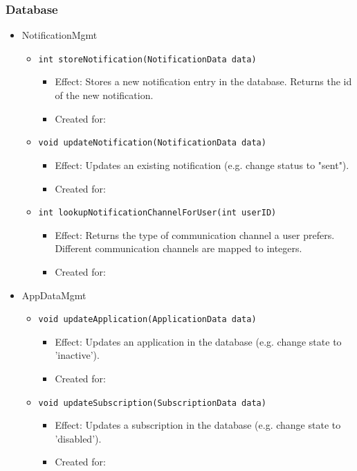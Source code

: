     \subsubsection{Database}
        \begin{itemize}
            \item NotificationMgmt
            \begin{itemize}
                \item \texttt{int storeNotification(NotificationData data)}
                \begin{itemize}
                    \item Effect: Stores a new notification entry in the database. Returns the id of the new notification.
                    \item Created for:
                \end{itemize}
                \item \texttt{void updateNotification(NotificationData data)}
                \begin{itemize}
                    \item Effect: Updates an existing notification (e.g. change status to "sent").
                    \item Created for:
                \end{itemize}
                \item \texttt{int lookupNotificationChannelForUser(int userID)}
                \begin{itemize}
                    \item Effect: Returns the type of communication channel a user prefers.
                                  Different communication channels are mapped to integers.
                    \item Created for:
                \end{itemize}
            \end{itemize}

            \item AppDataMgmt
            \begin{itemize}
                \item \texttt{void updateApplication(ApplicationData data)}
                \begin{itemize}
                    \item Effect: Updates an application in the database (e.g. change state to 'inactive').
                    \item Created for:
                \end{itemize}
                \item \texttt{void updateSubscription(SubscriptionData data)}
                \begin{itemize}
                    \item Effect: Updates a subscription in the database (e.g. change state to 'disabled').
                    \item Created for:
                \end{itemize}
            \end{itemize}
        \end{itemize}

